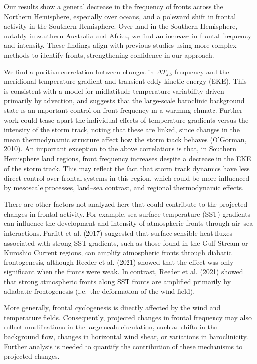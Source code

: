 \documentclass[
]{agujournal2019}
\begin{document}
Our results show a general decrease in the frequency of fronts across
the Northern Hemisphere, especially over oceans, and a poleward shift in
frontal activity in the Southern Hemisphere. Over land in the Southern
Hemisphere, notably in southern Australia and Africa, we find an
increase in frontal frequency and intensity. These findings align with
previous studies using more complex methods to identify fronts,
strengthening confidence in our approach.

We find a positive correlation between changes in \(\Delta T_{2.5}\)
frequency and the meridional temperature gradient and transient eddy
kinetic energy (EKE). This is consistent with a model for midlatitude
temperature variability driven primarily by advection, and suggests that
the large-scale baroclinic background state is an important control on
front frequency in a warming climate. Further work could tease apart the
individual effects of temperature gradients versus the intensity of the
storm track, noting that these are linked, since changes in the mean
thermodynamic structure affect how the storm track behaves (O'Gorman,
2010). An important exception to the above correlations is that, in
Southern Hemisphere land regions, front frequency increases despite a
decrease in the EKE of the storm track. This may reflect the fact that
storm track dynamics have less direct control over frontal systems in
this region, which could be more influenced by mesoscale processes,
land--sea contrast, and regional thermodynamic effects.

There are other factors not analyzed here that could contribute to the
projected changes in frontal activity. For example, sea surface
temperature (SST) gradients can influence the development and intensity
of atmospheric fronts through air--sea interactions. Parfitt et al.
(2017) suggested that surface sensible heat fluxes associated with
strong SST gradients, such as those found in the Gulf Stream or Kuroshio
Current regions, can amplify atmospheric fronts through diabatic
frontogenesis, although Reeder et al. (2021) showed that the effect was
only significant when the fronts were weak. In contrast, Reeder et al.
(2021) showed that strong atmospheric fronts along SST fronts are
amplified primarily by adiabatic frontogenesis (i.e.~the deformation of
the wind field).

More generally, frontal cyclogenesis is directly affected by the wind
and temperature fields. Consequently, projected changes in frontal
frequency may also reflect modifications in the large-scale circulation,
such as shifts in the background flow, changes in horizontal wind shear,
or variations in baroclinicity. Further analysis is needed to quantify
the contribution of these mechanisms to projected changes.
\end{document}
